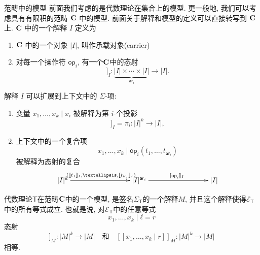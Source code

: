 \documentclass{beamer}
\newcommand{\theory}[1]{\mathsf{#1}} %
\newcommand{\signature}[1]{\Sigma_{\theory{#1}}} %
\newcommand{\equations}[1]{\mathcal{E}_{\theory{#1}}} %
\newcommand{\category}[1]{\text{\textbf{#1}}} %
\newcommand{\carrier}[1]{|#1|} %
\newcommand{\op}[1]{\mathsf{op}_{#1}} %
\newcommand{\arity}[1]{\mathsf{ar}_{#1}} %
\newcommand{\sem}[1]{[\![#1]\!]} %
\begin{document}
\begin{frame}{范畴中的模型}
前面我们考虑的是代数理论在集合上的模型. 更一般地, 我们可以考虑具有有限积的范畴 $\category{C}$ 中的模型. 前面关于解释和模型的定义可以直接转写到 $\category{C}$ 上. $\category{C}$ 中的一个解释 $I$ 定义为
\begin{enumerate}
  \item $\category{C}$ 中的一个对象 $\carrier{I}$, 叫作承载对象(carrier)
  \item 对每一个操作符 $\op{i}$, 有一个$\category{C}$中的态射
    \begin{equation*}
    \sem{\op{i}}_I : \underbrace{\carrier{I} × ⋯ × \carrier{I}}_{\arity{i}} → \carrier{I}.
  \end{equation*}
\end{enumerate}

解释 $I$ 可以扩展到上下文中的 $\Sigma$-项:
\begin{enumerate}
  \item 变量 $x_1, …, x_k ∣ x_i$ 被解释为第 $i$-个投影
    \begin{equation*}
    \sem{x_1, …, x_k ∣  x_i}_I = \pi_i : \carrier{I}^k → \carrier{I},
    \end{equation*}
  \item 上下文中的一个复合项
  \begin{equation*}
    x_1, …, x_k ∣ \op{i}(t_1, …, t_{\arity{i}})
  \end{equation*}
  被解释为态射的复合
  \begin{equation*}
    \xymatrix@+6em{
      {\carrier{I}^k} \ar[r]^{(\sem{t_1}_I, …, \sem{t_{\arity{i}}}_I)}
      &
      {\carrier{I}^{\arity{i}}} \ar[r]^{\sem{\op{i}}_I}
      &
      {\carrier{I}}
    }
  \end{equation*}
\end{enumerate}
\end{frame}

\begin{frame}
  代数理论$\theory{T}$在范畴$\category{C}$中的一个模型, 是签名$\signature{T}$的一个解释$M$, 并且这个解释使得$\equations{T}$中的所有等式成立. 也就是说, 对$\equations{T}$中的任意等式
  \begin{equation*}
  x_1, …, x_k ∣ ℓ = r
\end{equation*}
态射
\begin{equation*}
  \sem{x_1, …, x_k ∣ \ell}_M : \carrier{M}^k → \carrier{M}
  \quad\text{和}\quad
  \sem{x_1, …, x_k ∣ r}_M : \carrier{M}^k → \carrier{M}
\end{equation*}
相等.
\end{frame}
\end{document}
